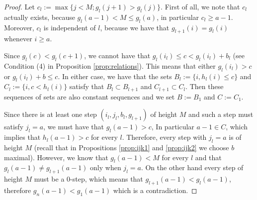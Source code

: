 \documentclass[10pt]{amsart}
\theoremstyle{definition}
\newcommand{\dyckpath}[2]{
\draw[line width=2pt] (#1) foreach \dir in {#2}{ -- ++(\dir*90:1)};
}
\newcommand{\gline}[4]{
\draw[line width=#4 pt, color=#3] (#1) -- (#2);
}
\begin{document}
\begin{proof}
Let $c_l:=\max\{ j< M; g_l(j+1)>g_l(j)\}$. First of all, we note that $c_l$ actually exists, because $g_l(a-1)<M\leq g_l(a)$, in particular $c_l\geq a-1$. Moreover, $c_l$ is independent of $l$, because we have that $g_{l+1}(i)=g_l(i)$ whenever $i\geq a$.


  Since $g_l(c)<g_l(c+1)$, we cannot have that  $g_l(i_l)\leq c<g_l(i_l)+b_l$ (see Condition (4) in Proposition \ref{prop:relations}). This means that either $g_l(i_l)> c$ or $g_l(i_l)+b\leq c$.   In either case, we have that the sets $B_l:=\{i, h_l(i)\leq c\}$ and $C_l:=\{i, c< h_l(i)\}$ satisfy that  $B_{l}\subset B_{l+1}$ and $C_{l+1}\subset C_l$. Then these sequences of sets are also constant sequences and we set $B:=B_1$ and $C:=C_1$.\par

  Since there is at least one step $(i_l,j_l,b_l,g_{l+1})$ of height $M$ and such a step must satisfy $j_l=a$, we must have that $g_l(a-1)>c$, In particular $a-1\in C$, which implies that $h_l(a-1)>c$ for every $l$. Therefore, every step with $j_l=a$ is of height $M$ (recall that in Propositions \ref{prop:ijk1} and \ref{prop:ijk2} we choose $b$ maximal). However, we know that $g_l(a-1)<M$ for every $l$ and that $g_l(a-1)\neq g_{l+1}(a-1)$ only when $j_l=a$. On the other hand every step of height $M$ must be a $0$-step, which means that $g_{l+1}(a-1)<g_l(a-1)$, therefore $g_n(a-1)<g_1(a-1)$ which is a contradiction.
\end{proof}
\end{document}
